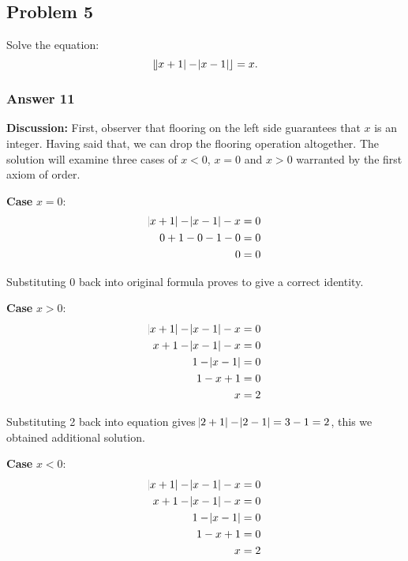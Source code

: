 \documentclass[11pt]{article}
\begin{document}
\subsection{Problem 5}
\label{sec-1-5}
Solve the equation:
\begin{equation*}
   \lfloor \abs{x+1}-\abs{x-1} \rfloor = x.
\end{equation*}


\subsubsection{Answer 11}
\label{sec-1-5-1}
\textbf{Discussion:} First, observer that flooring on the left side guarantees
that $x$ is an integer.  Having said that, we can drop the flooring operation
altogether.  The solution will examine three cases of $x < 0$, $x = 0$ and
$x > 0$ warranted by the first axiom of order.

\textbf{Case} $x=0$: 
\begin{equation*}
  \begin{aligned}
    \abs{x+1}-\abs{x-1}-x &= 0 \\
    0 + 1 - 0 - 1 - 0     &= 0 \\
    0                     &= 0
  \end{aligned}
\end{equation*}

Substituting 0 back into original formula proves to give a correct identity.

\textbf{Case} $x>0$:
\begin{equation*}
  \begin{aligned}
    \abs{x + 1} - \abs{x - 1} - x &= 0 \\
    x + 1 - \abs{x - 1} - x       &= 0 \\
    1 - \abs{x - 1}               &= 0 \\
    1 - x + 1                     &= 0 \\
    x                             &= 2
  \end{aligned}
\end{equation*}

Substituting 2 back into equation gives $\abs{2+1}-\abs{2-1}=3-1=2$, this
we obtained additional solution.

\textbf{Case} $x<0$:
\begin{equation*}
  \begin{aligned}
    \abs{x + 1} - \abs{x - 1} - x &= 0 \\
    x + 1 - \abs{x - 1} - x       &= 0 \\
    1 - \abs{x - 1}               &= 0 \\
    1 - x + 1                     &= 0 \\
    x                             &= 2
  \end{aligned}
\end{equation*}
\end{document}
